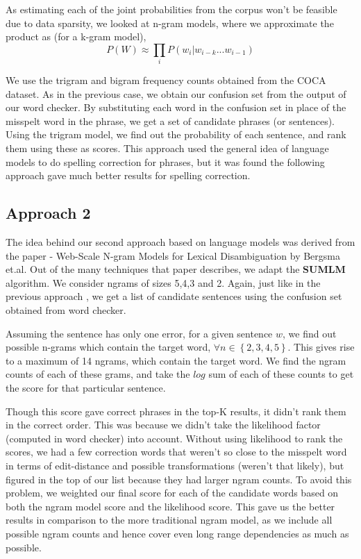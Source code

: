 As estimating each of the joint probabilities from the corpus won't be feasible due to data sparsity, we looked at n-gram models, where we approximate the product as (for a k-gram model),
\[P(W) \approx \prod_i P(w_i|w_{i-k}...w_{i-1}) \]

We use the trigram and bigram frequency counts obtained from the COCA dataset.
As in the previous case, we obtain our confusion set from the output of our word checker. By substituting each word in the confusion set in place of the misspelt word in the phrase, we get a set of candidate phrases (or sentences). 
Using the trigram model, we find out the probability of each sentence, and rank them using these as scores.  This approach used the general idea of language models to do spelling correction for phrases, but it was found the following approach gave much better results for spelling correction.


\subsection*{Approach 2}
The idea behind our second approach based on language models was derived from the paper - Web-Scale N-gram Models for Lexical Disambiguation  by Bergsma et.al.
Out of the many techniques that paper describes, we adapt the \textbf{SUMLM} algorithm. 
We consider ngrams of sizes 5,4,3 and 2. Again, just like in the previous approach , we get a list of candidate sentences using the confusion set obtained from word checker.

Assuming the sentence has only one error, for a given sentence $w$, we find out possible n-grams which contain the target word, $\forall n \in \left\lbrace 2,3,4,5 \right\rbrace$. This gives rise to a maximum of 14 ngrams, which contain the target word. We find the ngram counts of each of these grams, and take the $log$ sum of each of these counts to get the score for that particular sentence.



Though this score gave correct phrases in the top-K results, it didn't rank them in the correct order. This was because we didn't take the likelihood factor (computed in word checker) into account. Without using likelihood to rank the scores, we had a few correction words that weren't so close to the misspelt word in terms of edit-distance and possible transformations (weren't that likely), but figured in the top of our list because they had larger ngram counts. To avoid this problem, we weighted our final score for each of the candidate words based on both the ngram model score and the likelihood score. This gave us the better results in comparison to the more traditional ngram model, as we include all possible ngram counts and hence cover even long range dependencies as much as possible.

